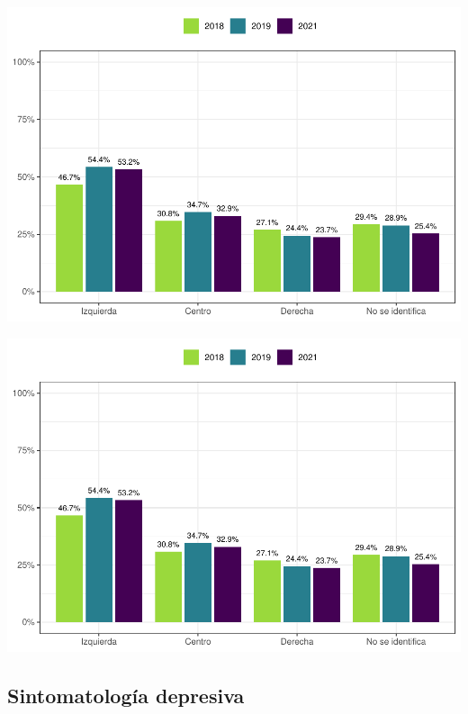 \documentclass[
  12pt,
]{book}
\begin{document}
\begin{center}\includegraphics{reporte-elsoc_files/figure-latex/unnamed-chunk-20-1} \end{center}

\begin{center}\includegraphics{reporte-elsoc_files/figure-latex/unnamed-chunk-21-1} \end{center}

\hypertarget{sintomatologuxeda-depresiva}{%
\subsection{Sintomatología depresiva}\label{sintomatologuxeda-depresiva}}
\end{document}

